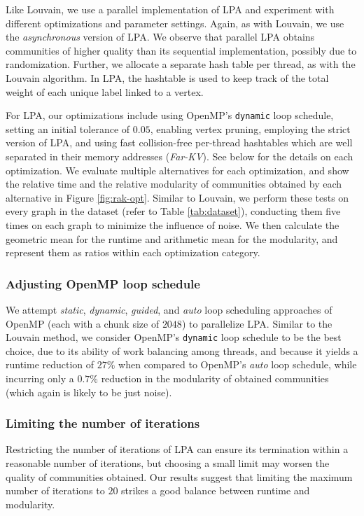 Like Louvain, we use a parallel implementation of LPA and experiment with different optimizations and parameter settings. Again, as with Louvain, we use the \textit{asynchronous} version of LPA. We observe that parallel LPA obtains communities of higher quality than its sequential implementation, possibly due to randomization. Further, we allocate a separate hash table per thread, as with the Louvain algorithm. In LPA, the hashtable is used to keep track of the total weight of each unique label linked to a vertex.

For LPA, our optimizations include using OpenMP's \verb|dynamic| loop schedule, setting an initial tolerance of $0.05$, enabling vertex pruning, employing the strict version of LPA, and using fast collision-free per-thread hashtables which are well separated in their memory addresses (\textit{Far-KV}). See below for the details on each optimization. We evaluate multiple alternatives for each optimization, and show the relative time and the relative modularity of communities obtained by each alternative in Figure \ref{fig:rak-opt}. Similar to Louvain, we perform these tests on every graph in the dataset (refer to Table \ref{tab:dataset}), conducting them five times on each graph to minimize the influence of noise. We then calculate the geometric mean for the runtime and arithmetic mean for the modularity, and represent them as ratios within each optimization category.


\subsubsection{Adjusting OpenMP loop schedule}

We attempt \textit{static}, \textit{dynamic}, \textit{guided}, and \textit{auto} loop scheduling approaches of OpenMP (each with a chunk size of $2048$) to parallelize LPA. Similar to the Louvain method, we consider OpenMP's \verb|dynamic| loop schedule to be the best choice, due to its ability of work balancing among threads, and because it yields a runtime reduction of $27\%$ when compared to OpenMP's \textit{auto} loop schedule, while incurring only a $0.7\%$ reduction in the modularity of obtained communities (which again is likely to be just noise).


\subsubsection{Limiting the number of iterations}

Restricting the number of iterations of LPA can ensure its termination within a reasonable number of iterations, but choosing a small limit may worsen the quality of communities obtained. Our results suggest that limiting the maximum number of iterations to $20$ strikes a good balance between runtime and modularity.


